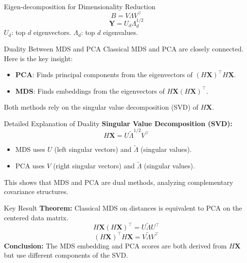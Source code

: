 \documentclass[11pt,handout,aspectratio=169]{beamer}
\begin{document}
\begin{frame}{}

\end{frame}

\begin{frame}{Eigen-decomposition for Dimensionality Reduction}
\[B = V \Lambda V^{\top}\]
\[\mathbf{Y} = U_d \Lambda_d^{1/2}\]
$U_d$: top $d$ eigenvectors.
$\Lambda_d$: top $d$ eigenvalues.
\end{frame}

\begin{frame}{Duality Between MDS and PCA}
Classical MDS and PCA are closely connected. Here is the key insight:
\begin{itemize}
    \item \textbf{PCA}: Finds principal components from the eigenvectors of $(H\mathbf{X})^{\top}H\mathbf{X}$.
    \item \textbf{MDS}: Finds embeddings from the eigenvectors of $H\mathbf{X}(H\mathbf{X})^{\top}$.
\end{itemize}
Both methods rely on the singular value decomposition (SVD) of $H\mathbf{X}$.
\end{frame}

\begin{frame}{Detailed Explanation of Duality}
\textbf{Singular Value Decomposition (SVD):}
\[ H\mathbf{X} = U \tilde{\Lambda}^{1/2} V^{\top} \]
\begin{itemize}
    \item MDS uses $U$ (left singular vectors) and $\tilde{\Lambda}$ (singular values).
    \item PCA uses $V$ (right singular vectors) and $\tilde{\Lambda}$ (singular values).
\end{itemize}
This shows that MDS and PCA are dual methods, analyzing complementary covariance structures.
\end{frame}

\begin{frame}{Key Result}
\textbf{Theorem:} Classical MDS on distances is equivalent to PCA on the centered data matrix. 
\[ H\mathbf{X}(H\mathbf{X})^{\top} = U \tilde{\Lambda} U^{\top} \]
\[ (H\mathbf{X})^{\top}H\mathbf{X} = V \tilde{\Lambda} V^{\top} \]
\textbf{Conclusion:} The MDS embedding and PCA scores are both derived from $H\mathbf{X}$ but use different components of the SVD.
\end{frame}
\end{document}
